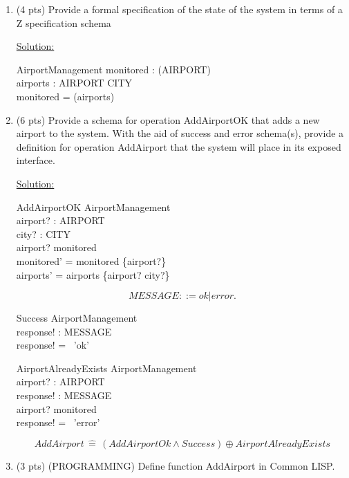 \documentclass[12pt]{article}
\begin{document}
\begin{spacing}{1.5}
\begin{enumerate}
        \item (4 pts) Provide a formal specification of the state of the system in terms of a Z specification schema
        
        \underline{Solution:}
        \begin{schema}{AirportManagement}
            monitored : (AIRPORT) \\
            airports : AIRPORT \pfun CITY \\
            \where
            monitored = (airports) 
        \end{schema}

        \item (6 pts) Provide a schema for operation AddAirportOK that adds a new airport to the
        system. With the aid of success and error schema(s), provide a definition for operation
        AddAirport that the system will place in its exposed interface.
        
        \underline{Solution:}
        \begin{schema}{AddAirportOK}
            \Delta AirportManagement \\
            airport? : AIRPORT \\
            city? : CITY \\
            \where
            airport? \notin monitored \\
            monitored' = monitored \cup \{airport?\} \\
            airports' = airports \cup \{airport? \mapsto city?\} \\
        \end{schema}
        $$MESSAGE ::= ok | error.$$

        \begin{schema}{Success}
            \Xi AirportManagement \\
            response! : MESSAGE \\
            \where
            response! = \, 'ok' \\
        \end{schema}

        \begin{schema}{AirportAlreadyExists}
            \Xi AirportManagement \\
            airport? : AIRPORT \\
            response! : MESSAGE \\
            \where
            airport? \in monitored \\
            response! = \, 'error' \\
        \end{schema}
        $$AddAirport \, \hat{=} \, (AddAirportOk \land Success) \oplus AirportAlreadyExists$$
        \newpage
        \item (3 pts) (PROGRAMMING) Define function AddAirport in Common LISP.
        

\end{enumerate}
\end{spacing}
\end{document}
